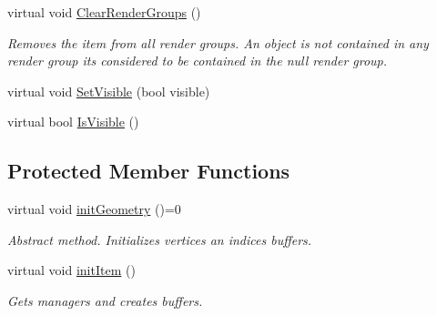 \begin{DoxyCompactItemize}
\item 
\mbox{\label{class_geometry_engine_1_1_geometry_world_item_1_1_geometry_item_1_1_geometry_item_a1dc7f2bbe7fc049344b055dfa21414b8}} 
virtual void \mbox{\hyperlink{class_geometry_engine_1_1_geometry_world_item_1_1_geometry_item_1_1_geometry_item_a1dc7f2bbe7fc049344b055dfa21414b8}{Clear\+Render\+Groups}} ()
\begin{DoxyCompactList}\small\item\em Removes the item from all render groups. An object is not contained in any render group it\textquotesingle{}s considered to be contained in the null render group. \end{DoxyCompactList}\item 
virtual void \mbox{\hyperlink{class_geometry_engine_1_1_geometry_world_item_1_1_geometry_item_1_1_geometry_item_ab2ed6e137c09bd08335452fa4bb7742a}{Set\+Visible}} (bool visible)
\item 
virtual bool \mbox{\hyperlink{class_geometry_engine_1_1_geometry_world_item_1_1_geometry_item_1_1_geometry_item_a7fece5cb2992278b918286e3aeb9b561}{Is\+Visible}} ()
\end{DoxyCompactItemize}
\subsection*{Protected Member Functions}
\begin{DoxyCompactItemize}
\item 
\mbox{\label{class_geometry_engine_1_1_geometry_world_item_1_1_geometry_item_1_1_geometry_item_a714b6742a99f60faddf9e486f5a5d71d}} 
virtual void \mbox{\hyperlink{class_geometry_engine_1_1_geometry_world_item_1_1_geometry_item_1_1_geometry_item_a714b6742a99f60faddf9e486f5a5d71d}{init\+Geometry}} ()=0
\begin{DoxyCompactList}\small\item\em Abstract method. Initializes vertices an indices buffers. \end{DoxyCompactList}\item 
\mbox{\label{class_geometry_engine_1_1_geometry_world_item_1_1_geometry_item_1_1_geometry_item_a9ccef8be90d38736e82f0d9666938b8a}} 
virtual void \mbox{\hyperlink{class_geometry_engine_1_1_geometry_world_item_1_1_geometry_item_1_1_geometry_item_a9ccef8be90d38736e82f0d9666938b8a}{init\+Item}} ()
\begin{DoxyCompactList}\small\item\em Gets managers and creates buffers. \end{DoxyCompactList}\end{DoxyCompactItemize}
